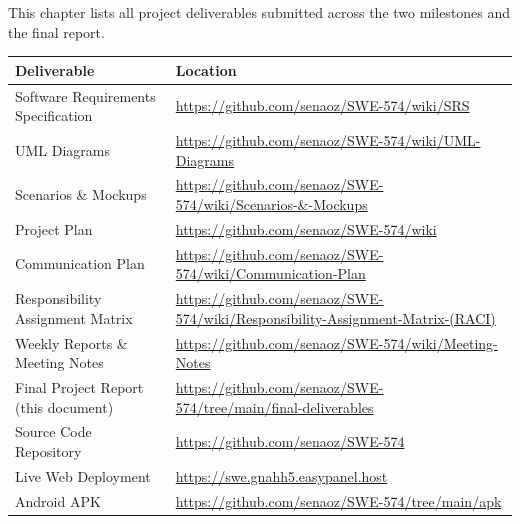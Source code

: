 \documentclass[11pt,a4paper]{report}
\begin{document}
This chapter lists all project deliverables submitted across the two milestones and the final report.

\begin{table}[h]
    \centering
    \begin{tabularx}{\textwidth}{|l|X|}
        \hline
        \textbf{Deliverable}                 & \textbf{Location}                                                                           \\
        \hline
        Software Requirements Specification  & \url{https://github.com/senaoz/SWE-574/wiki/SRS}                                            \\
        \hline
        UML Diagrams                         & \url{https://github.com/senaoz/SWE-574/wiki/UML-Diagrams}                                   \\
        \hline
        Scenarios \& Mockups                 & \url{https://github.com/senaoz/SWE-574/wiki/Scenarios-\&-Mockups}                           \\
        \hline
        Project Plan                         & \url{https://github.com/senaoz/SWE-574/wiki}                                                \\
        \hline
        Communication Plan                   & \url{https://github.com/senaoz/SWE-574/wiki/Communication-Plan}                             \\
        \hline
        Responsibility Assignment Matrix     & \url{https://github.com/senaoz/SWE-574/wiki/Responsibility-Assignment-Matrix-(RACI)}        \\
        \hline
        Weekly Reports \& Meeting Notes      & \url{https://github.com/senaoz/SWE-574/wiki/Meeting-Notes}                                  \\
        \hline
        Final Project Report (this document) & \url{https://github.com/senaoz/SWE-574/tree/main/final-deliverables}
        \\
        \hline
        Source Code Repository               & \url{https://github.com/senaoz/SWE-574}                                                     \\
        \hline
        Live Web Deployment                  & \url{https://swe.gnahh5.easypanel.host}                                                     \\
        \hline
        Android APK                          & \url{https://github.com/senaoz/SWE-574/tree/main/apk}                                        \\

\end{tabularx}
\end{table}
\end{document}
